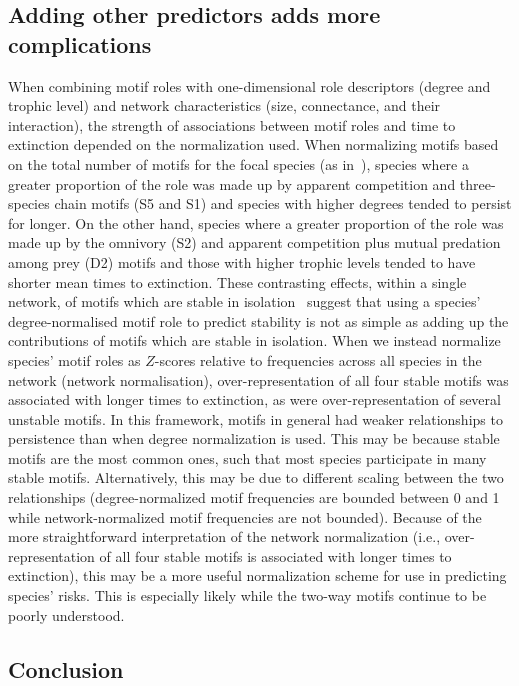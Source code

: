 \documentclass[12pt]{article}
\begin{document}
	\subsection*{Adding other predictors adds more complications}

		When combining motif roles with one-dimensional role descriptors (degree and trophic level) and network characteristics (size, connectance, and their interaction), the strength of associations between motif roles and time to extinction depended on the normalization used.
		When normalizing motifs based on the total number of motifs for the focal species (as in~\citet{Stouffer2012,Cirtwill2015}), species where a greater proportion of the role was made up by apparent competition and three-species chain motifs (S5 and S1) and species with higher degrees tended to persist for longer.
		On the other hand, species where a greater proportion of the role was made up by the omnivory (S2) and apparent competition plus mutual predation among prey (D2) motifs and those with higher trophic levels tended to have shorter mean times to extinction.
		These contrasting effects, within a single network, of motifs which are stable in isolation~\citep{Borrelli2015a} suggest that using a species' degree-normalised motif role to predict stability is not as simple as adding up the contributions of motifs which are stable in isolation.
		When we instead normalize species' motif roles as $Z$-scores relative to frequencies across all species in the network (network normalisation), over-representation of all four stable motifs was associated with longer times to extinction, as were over-representation of several unstable motifs.
		In this framework, motifs in general had weaker relationships to persistence than when degree normalization is used. 
		This may be because stable motifs are the most common ones, such that most species participate in many stable motifs.
		Alternatively, this may be due to different scaling between the two relationships (degree-normalized motif frequencies are bounded between 0 and 1 while network-normalized motif frequencies are not bounded).
		Because of the more straightforward interpretation of the network normalization (i.e., over-representation of all four stable motifs is associated with longer times to extinction), this may be a more useful normalization scheme for use in predicting species' risks.
		This is especially likely while the two-way motifs continue to be poorly understood.

	
	\subsection*{Conclusion}	
\end{document}
